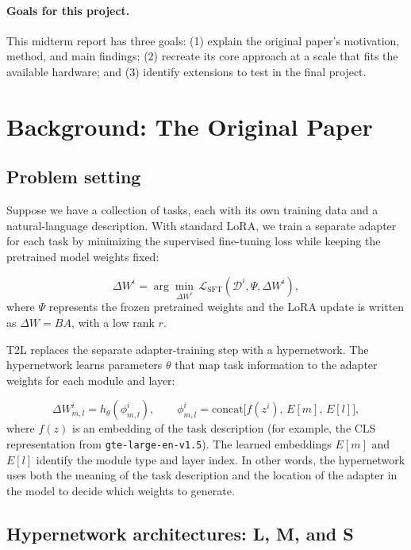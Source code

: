 \documentclass{article}
\begin{document}
\paragraph{Goals for this project.}
This midterm report has three goals: (1) explain the original paper's motivation, method, and main findings; (2) recreate its core approach at a scale that fits the available hardware; and (3) identify extensions to test in the final project.

\section{Background: The Original Paper}

\subsection{Problem setting}

Suppose we have a collection of tasks, each with its own training data and a natural-language description. With standard LoRA, we train a separate adapter for each task by minimizing the supervised fine-tuning loss while keeping the pretrained model weights fixed:

\begin{equation}
\Delta W^i = \arg\min_{\Delta W^i}\,\mathcal{L}_{\mathrm{SFT}}(\mathcal{D}^i,\Psi,\Delta W^i),
\end{equation}
where $\Psi$ represents the frozen pretrained weights and the LoRA update is written as $\Delta W = BA$, with a low rank $r$.

T2L replaces the separate adapter-training step with a hypernetwork. The hypernetwork learns parameters $\theta$ that map task information to the adapter weights for each module and layer:

\begin{equation}
\Delta W^i_{m,l} = h_\theta(\phi^i_{m,l}),\qquad
\phi^i_{m,l}=\mathrm{concat}\big[f(z^i),\,E[m],\,E[l]\big],
\end{equation}
where $f(z)$ is an embedding of the task description (for example, the CLS representation from \texttt{gte-large-en-v1.5}). The learned embeddings $E[m]$ and $E[l]$ identify the module type and layer index. In other words, the hypernetwork uses both the meaning of the task description and the location of the adapter in the model to decide which weights to generate.

\subsection{Hypernetwork architectures: L, M, and S}
\end{document}
